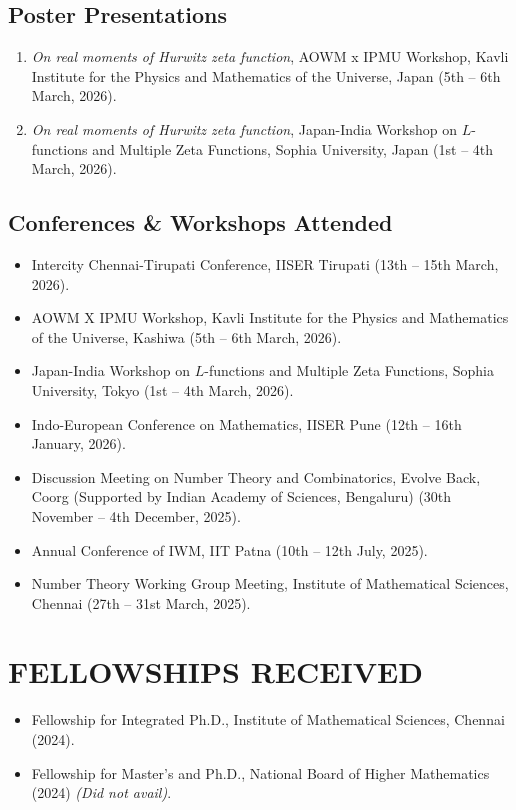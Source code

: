 \documentclass[a4paper,9pt]{extarticle}
\begin{document}
	\subsection*{Poster Presentations}
	\begin{enumerate}
		\item \textit{On real moments of Hurwitz zeta function}, AOWM x IPMU Workshop, Kavli Institute for the Physics and Mathematics of the Universe, Japan (5th -- 6th March, 2026).
		\item \textit{On real moments of Hurwitz zeta function}, Japan-India Workshop on $L$-functions and Multiple Zeta Functions, Sophia University, Japan (1st -- 4th March, 2026).
	\end{enumerate}
	
	\subsection*{Conferences \& Workshops Attended}
	\begin{itemize}
		\item Intercity Chennai-Tirupati Conference, IISER Tirupati (13th -- 15th March, 2026).
		\item AOWM X IPMU Workshop, Kavli Institute for the Physics and Mathematics of the Universe, Kashiwa (5th -- 6th March, 2026).
		\item Japan-India Workshop on $L$-functions and Multiple Zeta Functions, Sophia University, Tokyo (1st -- 4th March, 2026).
		\item Indo-European Conference on Mathematics, IISER Pune (12th -- 16th January, 2026).
		\item Discussion Meeting on Number Theory and Combinatorics, Evolve Back, Coorg (Supported by Indian Academy of Sciences, Bengaluru) (30th November -- 4th December, 2025).
		\item Annual Conference of IWM, IIT Patna (10th -- 12th July, 2025).
		\item Number Theory Working Group Meeting, Institute of Mathematical Sciences, Chennai (27th -- 31st March, 2025).
	\end{itemize}
	
	\section*{FELLOWSHIPS RECEIVED}
	\begin{itemize}
		\item Fellowship for Integrated Ph.D., Institute of Mathematical Sciences, Chennai (2024).
		\item Fellowship for Master's and Ph.D., National Board of Higher Mathematics (2024) \textit{(Did not avail)}.
	\end{itemize}
	
\end{document}
